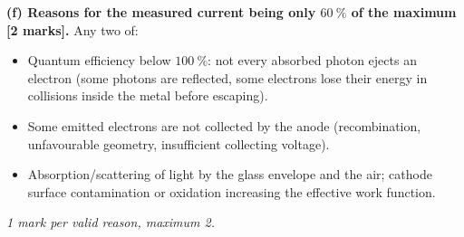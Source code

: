 \documentclass[11pt]{article}
\begin{document}
\begin{corrige}
\textbf{(f) Reasons for the measured current being only $60\ \%$ of the maximum [2 marks].} Any two of:
\begin{itemize}
\item Quantum efficiency below $100\ \%$: not every absorbed photon ejects an electron (some photons are reflected, some electrons lose their energy in collisions inside the metal before escaping).
\item Some emitted electrons are not collected by the anode (recombination, unfavourable geometry, insufficient collecting voltage).
\item Absorption/scattering of light by the glass envelope and the air; cathode surface contamination or oxidation increasing the effective work function.
\end{itemize}
\emph{1 mark per valid reason, maximum 2.}
\end{corrige}
\end{document}
